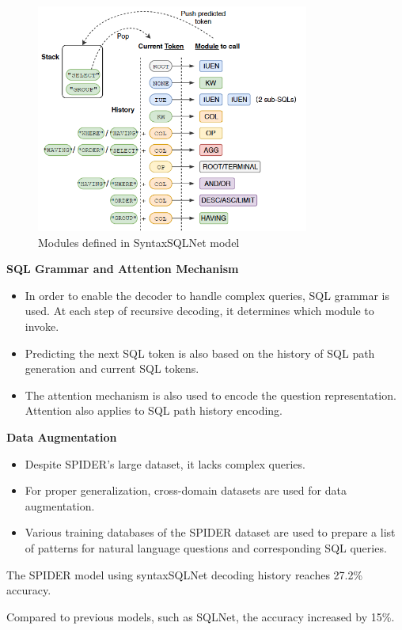 \begin{figure}[htb]
    \centering
    \includegraphics[width=0.8\textwidth]{pics/SyntaxSQLNet/Grammar.png}
    \caption{Modules defined in SyntaxSQLNet model}
    \label{fig:grammar}
\end{figure}


\textbf{SQL Grammar and Attention Mechanism}

\begin{itemize}
    \item In order to enable the decoder to handle complex queries, SQL grammar is used. At each step of recursive decoding, it determines which module to invoke.
    \item Predicting the next SQL token is also based on the history of SQL path generation and current SQL tokens.
    \item The attention mechanism is also used to encode the question representation. Attention also applies to SQL path history encoding.
\end{itemize}



\textbf{Data Augmentation}

\begin{itemize}
    \item Despite SPIDER's large dataset, it lacks complex queries.
    \item For proper generalization, cross-domain datasets are used for data augmentation.
    \item Various training databases of the SPIDER dataset are used to prepare a list of patterns for natural language questions and corresponding SQL queries.
\end{itemize}

The SPIDER model using syntaxSQLNet decoding history reaches 27.2\% accuracy.


Compared to previous models, such as SQLNet, the accuracy increased by 15\%.